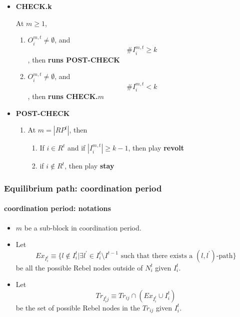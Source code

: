 \documentclass[12pt,letter]{article}
\theoremstyle{definition}
\theoremstyle{remark}
\theoremstyle{claim}
\begin{document}
\begin{itemize}
\begin{enumerate}
\end{enumerate}





\item \textbf{CHECK.k}

At $m\geq 1$, 
\begin{enumerate}


\item $O^{m,t}_i\neq \emptyset$, and
 \[\# I^{m,t}_i\geq k\]
, then 
\textbf{runs POST-CHECK }

\item $O^{m,t}_i\neq \emptyset$, and 
\[ \#I^{m,t}_i< k\]
, then \textbf{runs CHECK.$m$}
\end{enumerate}


\item \textbf{POST-CHECK}

\begin{enumerate}


\item At $m=|RP^t|$, then
\begin{enumerate}
\item If $i\in R^t$ and if $|I^{m,t}_i|\geq k-1$, then play
\textbf{revolt}

\item if $i\notin R^t$, then play
\textbf{stay}


\end{enumerate}
\end{enumerate}


\end{itemize}



\subsubsection{Equilibrium path: coordination period}
\paragraph{coordination period: notations}
\begin{itemize}
\item $m$ be a sub-block in coordination period.
\item Let 
\[Ex_{I^{t}_i}\equiv \{l\notin I^{t}_i|\exists l^{'}\in I^{t}_i\setminus I^{t-1}\text{ such that there exists a $(l,l^{'})$-path}\}\]
be all the possible Rebel nodes outside of $N^{t}_i$ given $I^{t}_i$.

\item Let
\[Tr_{I^{t}_ij}\equiv Tr_{ij}\cap (Ex_{I^{t}_i}\cup I^{t}_i)\]
be the set of possible Rebel nodes in the $Tr_{ij}$ given $I^{t}_i$. 

\end{itemize}
\end{document}
